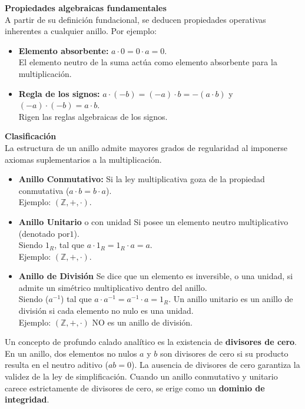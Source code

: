 \documentclass{article}
\begin{document}
\textbf{Propiedades algebraicas fundamentales}\\
A partir de su definición fundacional, se deducen propiedades operativas inherentes a cualquier anillo. Por ejemplo:

\begin{itemize}
    \item \textbf{Elemento absorbente:} $a \cdot 0 = 0 \cdot a = 0$.\\
    El elemento neutro de la suma actúa como elemento absorbente para la multiplicación.

    \item \textbf{Regla de los signos:} $a \cdot (-b) = (-a) \cdot b = -(a \cdot b)$ y $(-a) \cdot (-b) = a \cdot b$.\\
    Rigen las reglas algebraicas de los signos.
\end{itemize}

\textbf{Clasificación} \\
La estructura de un anillo admite mayores grados de regularidad al imponerse axiomas 
suplementarios a la multiplicación.\\
\begin{itemize}
    \item \textbf{Anillo Conmutativo:} Si la ley multiplicativa goza de la propiedad conmutativa ($a \cdot b = b \cdot a$). \\
    Ejemplo: $(\mathbb{Z}, +, \cdot)$.
    \item \textbf{Anillo Unitario} o con unidad Si posee un elemento neutro multiplicativo (denotado por$1$). \\
    Siendo $1_R$, tal que $a \cdot 1_R = 1_R \cdot a = a$.\\ 
    Ejemplo: $(\mathbb{Z}, +, \cdot)$.    
    \item \textbf{Anillo de División} Se dice que un elemento es inversible, o una unidad, si admite un simétrico multiplicativo dentro del anillo.  \\
    Siendo ($a^{-1}$) tal que $a \cdot a^{-1} = a^{-1} \cdot a = 1_R$. Un anillo unitario es un anillo de división si cada elemento no nulo es una unidad.\\
    Ejemplo: $(\mathbb{Z}, +, \cdot)$ NO es un anillo de división.
\end{itemize}

Un concepto de profundo calado analítico es la existencia de \textbf{divisores de cero}. En un anillo, dos elementos no nulos $a$ y $b$ son divisores de cero si su producto resulta en el neutro aditivo ($ab = 0$). La ausencia de divisores de cero garantiza la validez de la ley de simplificación. Cuando un anillo conmutativo y unitario carece estrictamente de divisores de cero, se erige como un \textbf{dominio de integridad}.
\end{document}

